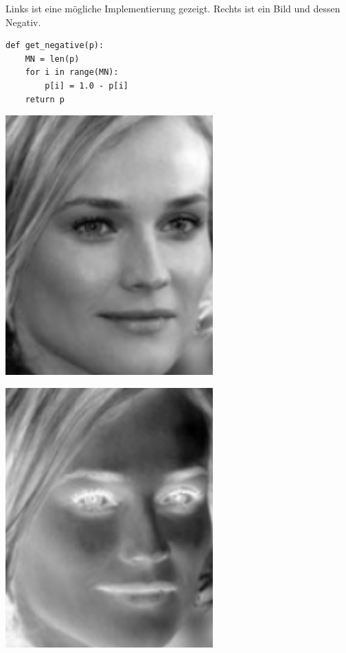 \begin{losung}
	Links ist eine mögliche Implementierung gezeigt.
	Rechts ist ein Bild und dessen Negativ.\\[0.5cm]
	\begin{minipage}{0.45\textwidth}
\begin{lstlisting}[style=python]
def get_negative(p):
	MN = len(p)
	for i in range(MN):
		p[i] = 1.0 - p[i]
	return p
\end{lstlisting}
	\end{minipage}\hfill
	\begin{minipage}{0.25\textwidth}\vspace{-1cm}
		\centering\includegraphics[width=0.6\textwidth]{images/vectormatrix/Diane_Kruger}
	\end{minipage}
	\begin{minipage}{0.25\textwidth}\vspace{-1cm}
		\centering\includegraphics[width=0.6\textwidth]{images/vectormatrix/Diane_Kruger_negative}
	\end{minipage}
\end{losung}